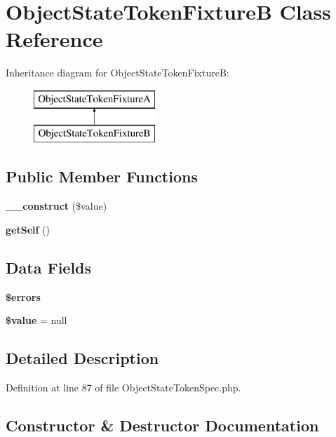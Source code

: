 \section{Object\+State\+Token\+Fixture\+B Class Reference}
\label{classspec_1_1_prophecy_1_1_argument_1_1_token_1_1_object_state_token_fixture_b}
Inheritance diagram for Object\+State\+Token\+Fixture\+B\+:\begin{figure}[H]
\begin{center}
\leavevmode
\includegraphics[height=2.000000cm]{classspec_1_1_prophecy_1_1_argument_1_1_token_1_1_object_state_token_fixture_b}
\end{center}
\end{figure}
\subsection*{Public Member Functions}
\begin{DoxyCompactItemize}
\item 
{\bf \+\_\+\+\_\+construct} (\$value)
\item 
{\bf get\+Self} ()
\end{DoxyCompactItemize}
\subsection*{Data Fields}
\begin{DoxyCompactItemize}
\item 
{\bf \$errors}
\item 
{\bf \$value} = null
\end{DoxyCompactItemize}


\subsection{Detailed Description}


Definition at line 87 of file Object\+State\+Token\+Spec.\+php.



\subsection{Constructor \& Destructor Documentation}
